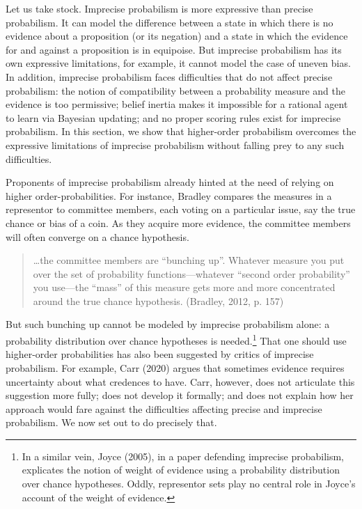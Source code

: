 \documentclass[
  letterpaper,
  DIV=11,
  numbers=noendperiod]{scrartcl}
\begin{document}
\label{sec:higher-order}

Let us take stock. Imprecise probabilism is more expressive than precise
probabilism. It can model the difference between a state in which there
is no evidence about a proposition (or its negation) and a state in
which the evidence for and against a proposition is in equipoise. But
imprecise probabilism has its own expressive limitations, for example,
it cannot model the case of uneven bias. In addition, imprecise
probabilism faces difficulties that do not affect precise probabilism:
the notion of compatibility between a probability measure and the
evidence is too permissive; belief inertia makes it impossible for a
rational agent to learn via Bayesian updating; and no proper scoring
rules exist for imprecise probabilism. In this section, we show that
higher-order probabilism overcomes the expressive limitations of
imprecise probabilism without falling prey to any such difficulties.

Proponents of imprecise probabilism already hinted at the need of
relying on higher order-probabilities. For instance, Bradley compares
the measures in a representor to committee members, each voting on a
particular issue, say the true chance or bias of a coin. As they acquire
more evidence, the committee members will often converge on a chance
hypothesis.

\begin{quote}
\dots the committee members are ``bunching up''. Whatever measure you
put over the set of probability functions---whatever ``second order
probability'' you use---the ``mass'' of this measure gets more and more
concentrated around the true chance hypothesis. (Bradley, 2012, p. 157)
\end{quote}

\noindent But such bunching up cannot be modeled by imprecise
probabilism alone: a probability distribution over chance hypotheses is
needed.\footnote{In a similar vein, Joyce (2005), in a paper defending
  imprecise probabilism, explicates the notion of weight of evidence
  using a probability distribution over chance hypotheses. Oddly,
  representor sets play no central role in Joyce's account of the weight
  of evidence.} That one should use higher-order probabilities has also
been suggested by critics of imprecise probabilism. For example, Carr
(2020) argues that sometimes evidence requires uncertainty about what
credences to have. Carr, however, does not articulate this suggestion
more fully; does not develop it formally; and does not explain how her
approach would fare against the difficulties affecting precise and
imprecise probabilism. We now set out to do precisely that.
\end{document}
